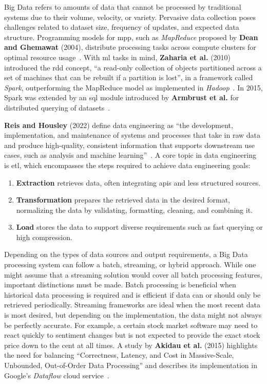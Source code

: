Big Data refers to amounts of data that cannot be processed by traditional systems due to their volume, velocity, or variety.
Pervasive data collection poses challenges related to dataset size, frequency of updates, and expected data structure.
Programming models for \ac{mpp}, such as \textit{MapReduce} proposed by \textbf{Dean and Ghemawat} (2004), distribute processing tasks across compute clusters for optimal resource usage~\cite{Dean2004}.
With \ac{ml} tasks in mind, \textbf{Zaharia et al.} (2010) introduced the \ac{rdd} concept, ``a read-only collection of objects partitioned across a set of machines that can be rebuilt if a partition is lost'', in a framework called \textit{Spark}, outperforming the MapReduce model as implemented in \textit{Hadoop}~\cite{Zaharia2010}.
In 2015, Spark was extended by an \ac{sql} module introduced by \textbf{Armbrust et al.} for distributed querying of datasets~\cite{Armbrust2015}.

\textbf{Reis and Housley} (2022) define data engineering as ``the development, implementation, and maintenance of systems and processes that take in raw data and produce high-quality, consistent information that supports downstream use cases, such as analysis and machine learning''~\cite{Reis2022}.
A core topic in data engineering is \ac{etl}, which encompasses the steps required to achieve data engineering goals:

\begin{enumerate}
    \item \textbf{Extraction} retrieves data, often integrating \acp{api} and less structured sources.
    \item \textbf{Transformation} prepares the retrieved data in the desired format, normalizing the data by validating, formatting, cleaning, and combining it.
    \item \textbf{Load} stores the data to support diverse requirements such as fast querying or high compression.
\end{enumerate}

Depending on the types of data sources and output requirements, a Big Data processing system can follow a batch, streaming, or hybrid approach.
While one might assume that a streaming solution would cover all batch processing features, important distinctions must be made.
Batch processing is beneficial when historical data processing is required and is efficient if data can or should only be retrieved periodically.
Streaming frameworks are ideal when the most recent data is most desired, but depending on the implementation, the data might not always be perfectly accurate.
For example, a certain stock market software may need to react quickly to sentiment changes but is not expected to provide the exact stock price down to the cent at all times.
A study by \textbf{Akidau et al.} (2015) highlights the need for balancing ``Correctness, Latency, and Cost in Massive-Scale, Unbounded, Out-of-Order Data Processing'' and describes its implementation in Google's \textit{Dataflow} cloud service~\cite{Akidau2015}.

